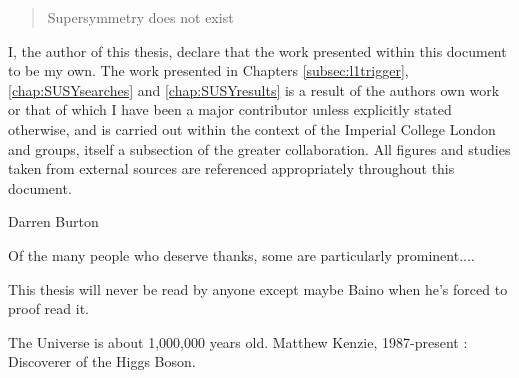
\begin{abstract}%
  Supersymmetry does not exist
  \end{abstract}


\begin{declaration}
  I, the author of this thesis, declare that the work presented within this document to be my own.  The work presented in Chapters \ref{subsec:l1trigger}, \ref{chap:SUSYsearches} and \ref{chap:SUSYresults} is a result of the authors own work or that of which I have been a major contributor unless explicitly stated otherwise, and is carried out within the context of the Imperial College London and \CERN \SUSY groups, itself a subsection of the greater \CMS collaboration.  All figures and studies taken from external sources are referenced appropriately throughout this document.
  
  \vspace*{1cm}
  \begin{flushright}
    Darren Burton
  \end{flushright}
\end{declaration}


\begin{acknowledgements}
  Of the many people who deserve thanks, some are particularly prominent....
\end{acknowledgements}


\begin{preface}
  This thesis will never be read by anyone except maybe Baino when he's forced to proof read it.

  \noindent
  
\end{preface}

\tableofcontents

\frontquote%
  {The Universe is about 1,000,000 years old.}%
  {Matthew Kenzie, 1987-present : Discoverer of the Higgs Boson.}
